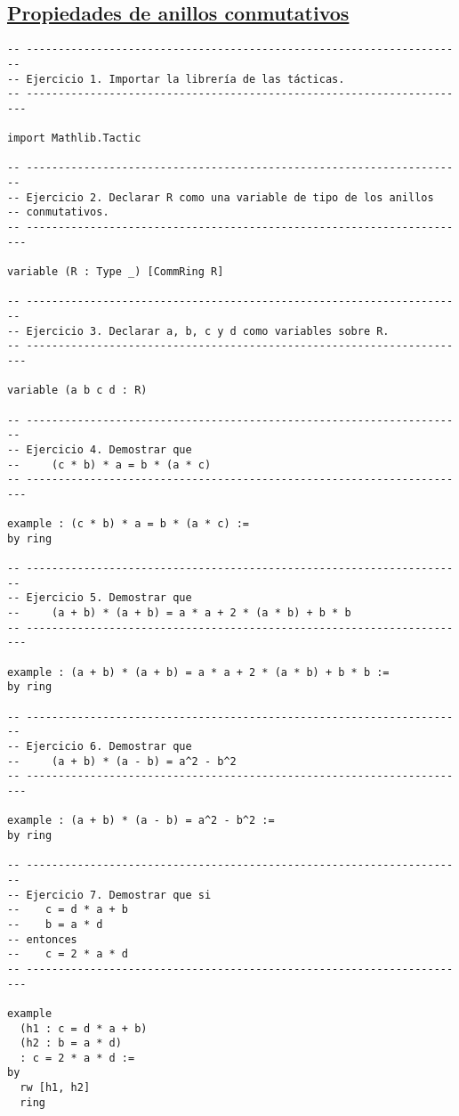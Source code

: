 \subsection{\href{./src/Basicos/Propiedades\_de\_anillos\_conmutativos.lean}{Propiedades de anillos conmutativos}}
\label{sec:org2c3f563}
\begin{verbatim}
-- ---------------------------------------------------------------------
-- Ejercicio 1. Importar la librería de las tácticas.
-- ----------------------------------------------------------------------

import Mathlib.Tactic

-- ---------------------------------------------------------------------
-- Ejercicio 2. Declarar R como una variable de tipo de los anillos
-- conmutativos.
-- ----------------------------------------------------------------------

variable (R : Type _) [CommRing R]

-- ---------------------------------------------------------------------
-- Ejercicio 3. Declarar a, b, c y d como variables sobre R.
-- ----------------------------------------------------------------------

variable (a b c d : R)

-- ---------------------------------------------------------------------
-- Ejercicio 4. Demostrar que
--     (c * b) * a = b * (a * c)
-- ----------------------------------------------------------------------

example : (c * b) * a = b * (a * c) :=
by ring

-- ---------------------------------------------------------------------
-- Ejercicio 5. Demostrar que
--     (a + b) * (a + b) = a * a + 2 * (a * b) + b * b
-- ----------------------------------------------------------------------

example : (a + b) * (a + b) = a * a + 2 * (a * b) + b * b :=
by ring

-- ---------------------------------------------------------------------
-- Ejercicio 6. Demostrar que
--     (a + b) * (a - b) = a^2 - b^2
-- ----------------------------------------------------------------------

example : (a + b) * (a - b) = a^2 - b^2 :=
by ring

-- ---------------------------------------------------------------------
-- Ejercicio 7. Demostrar que si
--    c = d * a + b
--    b = a * d
-- entonces
--    c = 2 * a * d
-- ----------------------------------------------------------------------

example
  (h1 : c = d * a + b)
  (h2 : b = a * d)
  : c = 2 * a * d :=
by
  rw [h1, h2]
  ring
\end{verbatim}

